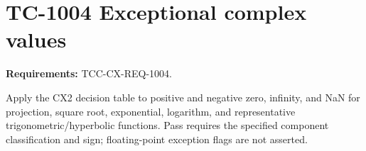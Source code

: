\documentclass{article}
\begin{document}
\section*{TC-1004 Exceptional complex values}
\textbf{Requirements:} TCC-CX-REQ-1004.

Apply the CX2 decision table to positive and negative zero, infinity, and NaN
for projection, square root, exponential, logarithm, and representative
trigonometric/hyperbolic functions. Pass requires the specified component
classification and sign; floating-point exception flags are not asserted.
\end{document}
